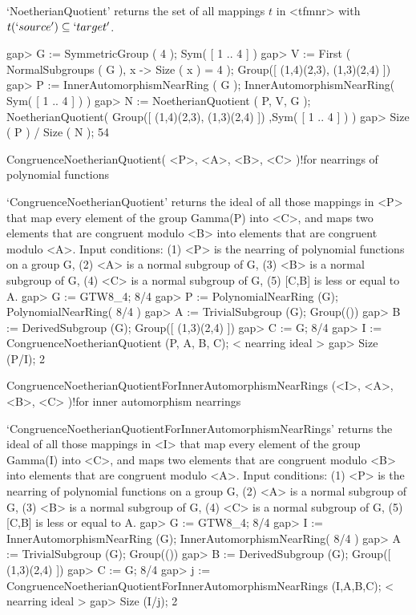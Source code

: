 `NoetherianQuotient' returns the set of all mappings $t$ in <tfmnr>
with $t(`source') \subseteq `target'$.

\beginexample
    gap> G := SymmetricGroup ( 4 );
    Sym( [ 1 .. 4 ] )
    gap> V := First ( NormalSubgroups ( G ), x -> Size ( x ) = 4 );
    Group([ (1,4)(2,3), (1,3)(2,4) ])
    gap> P := InnerAutomorphismNearRing ( G );
    InnerAutomorphismNearRing( Sym( [ 1 .. 4 ] ) )
    gap> N := NoetherianQuotient ( P, V, G );
    NoetherianQuotient( Group([ (1,4)(2,3), (1,3)(2,4) ]) ,Sym(
    [ 1 .. 4 ] ) )
    gap> Size ( P ) / Size ( N );
    54
\endexample

\>CongruenceNoetherianQuotient( <P>, <A>, <B>, <C> )!{for nearrings of polynomial functions}

`CongruenceNoetherianQuotient' returns the ideal of all those  mappings in <P> that
map every element of the group Gamma(P) into <C>, and maps two elements that
are congruent modulo <B> into elements that are congruent modulo <A>.
Input conditions: (1) <P> is the nearring of polynomial functions on a group G,
                  (2) <A> is a normal subgroup of G,
                  (3) <B> is a normal subgroup of G,
                  (4) <C> is a normal subgroup of G,
                  (5) [C,B] is less or equal to A.
\beginexample
    gap> G := GTW8_4;
    8/4
    gap> P := PolynomialNearRing (G);
    PolynomialNearRing( 8/4 )
    gap> A := TrivialSubgroup (G);
    Group(())
    gap> B := DerivedSubgroup (G);
    Group([ (1,3)(2,4) ])
    gap> C := G;
    8/4
    gap> I := CongruenceNoetherianQuotient (P, A, B, C);
    < nearring ideal >
    gap> Size (P/I);
    2
\endexample

\>CongruenceNoetherianQuotientForInnerAutomorphismNearRings (<I>, <A>, <B>, <C> )!{for inner automorphism nearrings}

`CongruenceNoetherianQuotientForInnerAutomorphismNearRings' returns the ideal of all those  mappings in <I> that
map every element of the group Gamma(I) into <C>, and maps two elements that
are congruent modulo <B> into elements that are congruent modulo <A>.
Input conditions: (1) <P> is the nearring of polynomial functions on a group G,
                  (2) <A> is a normal subgroup of G,
                  (3) <B> is a normal subgroup of G,
                  (4) <C> is a normal subgroup of G,
                  (5) [C,B] is less or equal to A.
\beginexample
    gap> G := GTW8_4;
    8/4
    gap> I := InnerAutomorphismNearRing (G);
    InnerAutomorphismNearRing( 8/4 )
    gap> A := TrivialSubgroup (G);
    Group(())
    gap> B := DerivedSubgroup (G);
    Group([ (1,3)(2,4) ])
    gap> C := G;
    8/4
    gap> j := CongruenceNoetherianQuotientForInnerAutomorphismNearRings (I,A,B,C);
    < nearring ideal >
    gap> Size (I/j);
    2
\endexample

